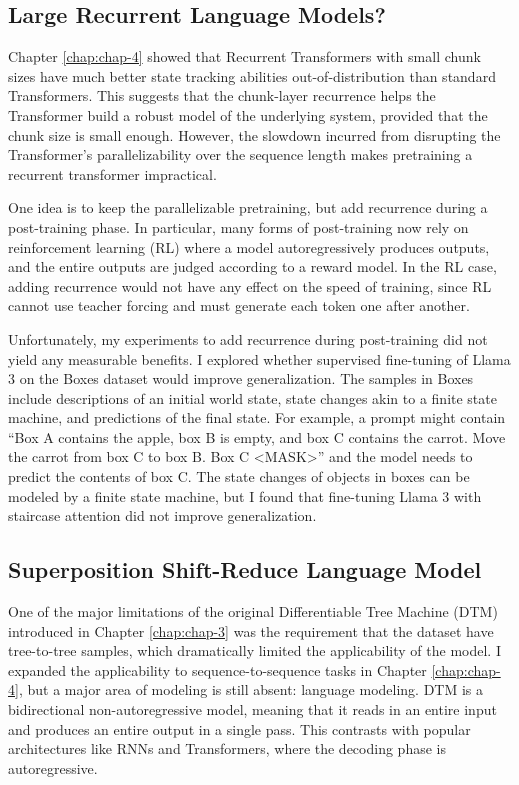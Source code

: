 \subsection{Large Recurrent Language Models?}
Chapter \ref{chap:chap-4} showed that Recurrent Transformers with small chunk sizes have much better state tracking abilities out-of-distribution than standard Transformers. This suggests that the chunk-layer recurrence helps the Transformer build a robust model of the underlying system, provided that the chunk size is small enough. However, the slowdown incurred from disrupting the Transformer's parallelizability over the sequence length makes pretraining a recurrent transformer impractical.

One idea is to keep the parallelizable pretraining, but add recurrence during a post-training phase. In particular, many forms of post-training now rely on reinforcement learning (RL) where a model autoregressively produces outputs, and the entire outputs are judged according to a reward model. In the RL case, adding recurrence would not have any effect on the speed of training, since RL cannot use teacher forcing and must generate each token one after another.

Unfortunately, my experiments to add recurrence during post-training did not yield any measurable benefits. I explored whether supervised fine-tuning of Llama 3 \citep{grattafiori2024llama3herdmodels} on the Boxes dataset \citep{kim-schuster-2023-entity} would improve generalization. The samples in Boxes include descriptions of an initial world state, state changes akin to a finite state machine, and predictions of the final state. For example, a prompt might contain ``Box A contains the apple, box B is empty, and box C contains the carrot. Move the carrot from box C to box B. Box C <MASK>'' and the model needs to predict the contents of box C. The state changes of objects in boxes can be modeled by a finite state machine, but I found that fine-tuning Llama 3 with staircase attention \citep{ju_staircase_2022} did not improve generalization. 


\subsection{Superposition Shift-Reduce Language Model}
One of the major limitations of the original Differentiable Tree Machine (DTM) introduced in Chapter \ref{chap:chap-3} was the requirement that the dataset have tree-to-tree samples, which dramatically limited the applicability of the model. I expanded the applicability to sequence-to-sequence tasks in Chapter \ref{chap:chap-4}, but a major area of modeling is still absent: language modeling. DTM is a bidirectional non-autoregressive model, meaning that it reads in an entire input and produces an entire output in a single pass. This contrasts with popular architectures like RNNs and Transformers, where the decoding phase is autoregressive.

